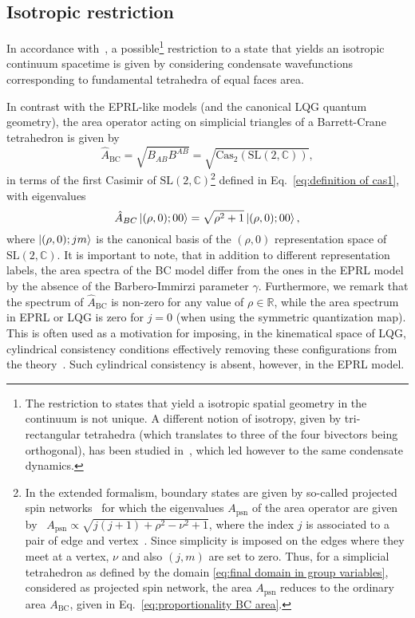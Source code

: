 \documentclass[11pt,a4paper]{article}
\newcommand{\R}{\mathbb R}
\newcommand{\C}{\mathbb C}
\newcommand{\cas}{\textrm{Cas}}     %
\newcommand{\SL}{\text{SL$(2,\C)$}}
\begin{document}
\subsection{Isotropic restriction}\label{subsec:Isotropic Restriction and Fixing of Left Intertwiner}

In accordance with~\cite{Oriti:2016qtz,Gielen:2016dss,Pithis:2016cxg,Pithis:2019tvp}, a possible\footnote{The restriction to states that yield a isotropic spatial geometry in the continuum is not unique. A different notion of isotropy, given by tri-rectangular tetrahedra (which translates to three of the four bivectors being orthogonal), has been studied in~\cite{Pithis:2019tvp,Pithis:2016cxg}, which led however to the same condensate dynamics.} restriction to a state that yields an isotropic continuum spacetime is given by considering condensate wavefunctions corresponding to fundamental tetrahedra of equal faces area. 
 
In contrast with the EPRL-like models (and the canonical LQG quantum geometry), the area operator acting on simplicial triangles of a Barrett-Crane tetrahedron is given by 
%
\begin{equation}
\hat{A}_{\text{BC}}
=
\sqrt{B_{AB}B^{AB}}
=
\sqrt{\cas_2(\SL)},
\end{equation}
%
in terms of the first Casimir of $\SL$\footnote{In the extended formalism, boundary states are given by so-called projected spin networks~\cite{Livine:2002ak,Alexandrov:2002br} for which the eigenvalues $A_{\text{psn}}$ of the area operator are given by~\cite{Alexandrov:2001pa} $\label{eq:proportionality PSN area}
A_{\text{psn}}\propto \sqrt{j(j+1)+\rho^2-\nu^2+1}$, where the index $j$ is associated to a pair of edge and vertex~\cite{Livine:2002ak}. Since simplicity is imposed on the edges where they meet at a vertex, $\nu$ and also $(j,m)$ are set to zero. Thus, for a simplicial tetrahedron as defined by the domain \eqref{eq:final domain in group variables}, considered as projected spin network, the area $A_{\text{psn}}$ reduces to the ordinary area $A_{\text{BC}}$, given in Eq.~\eqref{eq:proportionality BC area}.} defined in Eq.~\eqref{eq:definition of cas1}, with eigenvalues
%
\begin{equation}\label{eq:proportionality BC area}
\hat{A}_{BC}\ket{(\rho,0);00} =  \sqrt{\rho^2+1}\ket{(\rho,0);00},
\end{equation}
%
where $\ket{(\rho,0);jm}$ is the canonical basis of the $(\rho,0)$ representation space of $\SL$. 
It is important to note, that in addition to different representation labels, the area spectra of the BC model differ from the ones in the EPRL model by the absence of the Barbero-Immirzi parameter $\gamma$. Furthermore, we remark that the spectrum of $\hat{A}_{\text{BC}}$ is non-zero for any value of $\rho\in\R$, while the area spectrum in EPRL or LQG is zero for $j=0$ (when using the symmetric quantization map). This is often used as a motivation for imposing, in the kinematical space of LQG, cylindrical consistency conditions effectively removing these configurations from the theory~\cite{Thiemann2007a}. Such cylindrical consistency is absent, however, in the EPRL model.
\end{document}
